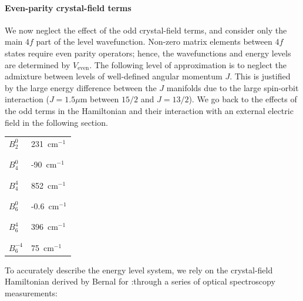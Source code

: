 \paragraph{Even-parity crystal-field terms} We now neglect the effect of the odd crystal-field terms, and consider only the main $4f$ part of the \Er level wavefunction. Non-zero matrix elements between $4f$ states require even parity operators; hence, the wavefunctions and energy levels are determined by $V_\mathrm{even}$. The following level of approximation is to neglect the admixture between levels of well-defined angular momentum $J$. This is justified by the large energy difference between the $J$ manifolds due to the large spin-orbit interaction ($J=1.5 \mu \mathrm{m}$ between $15/2$ and $J=13/2$). We go back to the effects of the odd terms in the Hamiltonian and their interaction with an external electric field in the following section.

\begin{margintable}
\centering
\begin{tabular}{l|l}
$B_2^0$    & 231~cm$^{-1}$  \\[-1em] \\ \hline \\[-1em]
$B_4^0$    & -90~cm$^{-1}$  \\[-1em] \\ \hline \\[-1em]
$B_4^4$    & 852~cm$^{-1}$  \\[-1em] \\ \hline \\[-1em]
$B_6^0$    & -0.6~cm$^{-1}$ \\[-1em] \\ \hline \\[-1em]
$B_6^4$    & 396~cm$^{-1}$  \\[-1em] \\ \hline \\[-1em]
$B_6^{-4}$ & 75~cm$^{-1}$  
\end{tabular}
\caption[Crystal field parameters]{Crystal field parameters for \Er:\Ca measured in \cite{enrique_optical_1971} with the operator normalization as defined in \cite{erath_crystal_1961}}
\end{margintable}

To accurately describe the \Er energy level system, we rely on the crystal-field Hamiltonian derived by Bernal \cite{enrique_optical_1971} for \Er:\Ca through a series of optical spectroscopy measurements:

